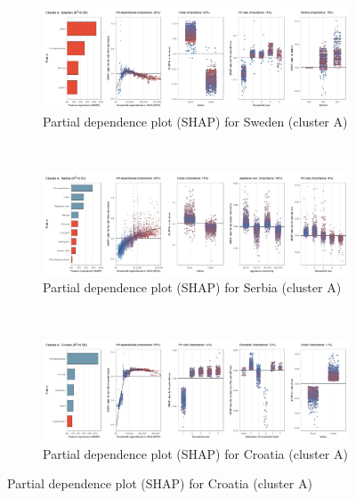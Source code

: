 \begin{figure}[ht!]\ContinuedFloat
    \centering
   \begin{subfigure}[b]{\textwidth}
         \centering
         \caption{Partial dependence plot (SHAP) for Sweden (cluster A)}
         \label{fig:5b_SWE}
         \includegraphics[width=\textwidth]{Figure 5b/Figure_5b_SWE}         
     \end{subfigure}
    \\
    \vspace{0.5cm}
   \begin{subfigure}[b]{\textwidth}
         \centering
         \caption{Partial dependence plot (SHAP) for Serbia (cluster A)}
         \label{fig:5b_SRB}
         \includegraphics[width=\textwidth]{Figure 5b/Figure_5b_SRB}         
     \end{subfigure}
    \\
    \vspace{0.5cm}
   \begin{subfigure}[b]{\textwidth}
         \centering
         \caption{Partial dependence plot (SHAP) for Croatia (cluster A)}
         \label{fig:5b_HRV}
         \includegraphics[width=\textwidth]{Figure 5b/Figure_5b_HRV}

\end{subfigure}
\end{figure}
